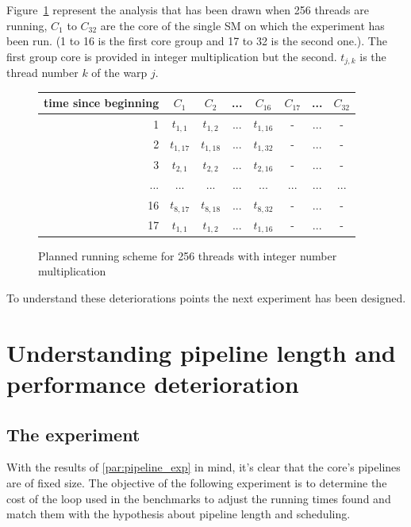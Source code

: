 \documentclass{article}
\begin{document}
   Figure~\ref{fig:int_prediction_256} represent the analysis that has been drawn when 256 threads are running, $C_1$ to $C_{32}$ are the core of the single SM on which the experiment has been run. (1 to 16 is the first core group and 17 to 32 is the second one.). The first group core is provided in integer multiplication but the second. $t_{j,k}$ is the thread number $k$ of the warp $j$.
   \begin{figure}[h]
      \centering
       \begin{tabular}{ | r || c | c | c | c | c | c | c | }
    	    \hline
    	    time since beginning & $C_1$ & $C_2$ & ... & $C_{16}$ & $C_{17}$ & ... & $C_{32}$ \\ \hline  \hline
    	   1 & $t_{1,1}$ & $t_{1,2}$ & ... & $t_{1,16}$ & - & ... & - \\ \hline 
    	   2 & $t_{1,17}$ & $t_{1,18}$ & ... & $t_{1,32}$ & - & ... & - \\ \hline
    	   3 & $t_{2,1}$ & $t_{2,2}$ & ... & $t_{2,16}$ & - & ... & - \\ \hline
    	   ... & ... & ... & ... & ... & ... & ... & ... \\ \hline
    	   16 & $t_{8,17}$ & $t_{8,18}$ & ... & $t_{8,32}$ & - & ... & - \\ \hline
    	   17 & $t_{1,1}$ & $t_{1,2}$ & ... & $t_{1,16}$ & - & ... & - \\ \hline
  	\end{tabular}
  	\captionsetup{justification=centering}
  	\caption{Planned running scheme for 256 threads with integer number multiplication}
  	\label{fig:int_prediction_256}
   \end{figure}

    To understand these deteriorations points the next experiment has been designed.

\section{Understanding pipeline length and performance deterioration}
    \subsection{The experiment}
    With the results of \ref{par:pipeline_exp} in mind, it's clear that the core's pipelines
    are of fixed size. The objective of the following experiment is to determine the cost of
    the loop used in the benchmarks to adjust the running times found and match them with
    the hypothesis about pipeline length and scheduling. 
\end{document}
